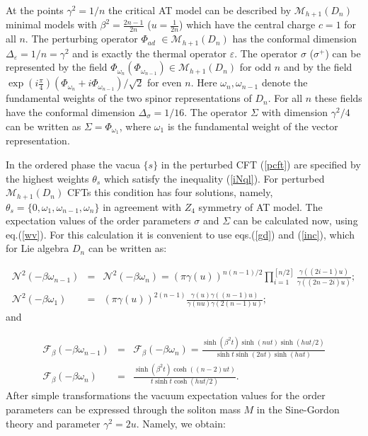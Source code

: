 \documentclass[a4paper,12pt]{article}
\begin{document}
At the points $\gamma ^2=1/n$ the critical AT model can be described by 
$\mathcal{M}_{h+1}(D_n)$ minimal models 
with $\beta ^2=\frac{2n-1}{2n}$ ($u=\frac 1{2n}$) 
which  have the central charge $c=1$ for all $n$. The
perturbing operator $\Phi _{ad}$ $\in \mathcal{M}_{h+1}(D_n)$ has the
conformal dimension  $\Delta _\varepsilon =1/n=\gamma ^2$ and is exactly the
thermal operator $\varepsilon $. The operator $\sigma $ ($\sigma ^{+}$) can
be represented by the field $\Phi _{\omega _n}(\Phi _{\omega _{n-1}})\in 
\mathcal{M}_{h+1}(D_n)$ for odd $n$ and by the field $\exp (i\frac \pi
4)(\Phi _{\omega _n}+i\Phi _{\omega _{n-1}})/\sqrt{2}$ for even $n$. Here 
$\omega _n,\omega _{n-1}$ denote the fundamental weights of the two spinor
representations of $D_n$. For all $n$ these fields have the conformal
dimension $\Delta _{\sigma}=1/16$. The operator $\Sigma $ 
with dimension $\gamma^2/4$ can be written as 
$\Sigma =\Phi _{\omega _1}$, where $\omega _1$ is
the fundamental weight of the vector representation.

In the ordered phase the vacua $\{s\}$ in the perturbed CFT (\ref{pcft}) are
specified by the highest weights $\theta _s$ which satisfy the inequality
(\ref{iNql}). For perturbed  $\mathcal{M}_{h+1}(D_n)$ CFTs this condition has
four solutions, namely, $\theta _s=\{0,\omega _1,\omega _{n-1},\omega _n\}$ in
agreement with $Z_4$ symmetry of AT model. The expectation values of the
order parameters $\sigma $ and $\Sigma $ can be calculated now, using
eq.(\ref{wv}). For this calculation it is convenient to use eqs.(\ref{gd}) and
(\ref{inc}), which for Lie algebra $D_n$ can be written as:

\begin{eqnarray}
\mathcal{N}^2(-\beta \omega _{n-1}) &=&\mathcal{N}^2(-\beta \omega
_n)=\left( \pi \gamma (u)\right) ^{n(n-1)/2}\prod\limits_{i=1}^{[n/2]}
\frac{\gamma ((2i-1)u)}{\gamma ((2n-2i)u)};  \nonumber \\
\mathcal{N}^2(-\beta \omega _1) &=&\left( \pi \gamma (u)\right) ^{2(n-1)}
\frac{\gamma (u)\gamma ((n-1)u)}{\gamma (nu)\gamma (2(n-1)u)};  \label{nDnn}
\end{eqnarray}
and

\begin{eqnarray}
\mathcal{F}_\beta (-\beta \omega _{n-1}) &=&\mathcal{F}_\beta (-\beta \omega
_n)=\frac{\sinh (\beta ^2t)\sinh (nut)\sinh (hut/2)}{\sinh t\sinh (2ut)\sinh
(hut)}  \nonumber \\
\mathcal{F}_\beta (-\beta \omega _n) &=&\frac{\sinh (\beta ^2t)\cosh
((n-2)ut)}{t\sinh t\cosh (hut/2)}.  \label{fDnn}
\end{eqnarray}
After simple transformations the vacuum expectation values for the order
parameters can be expressed through the soliton mass $M$ in the Sine-Gordon
theory and parameter $\gamma ^2=2u$. Namely, we obtain:
\end{document}
